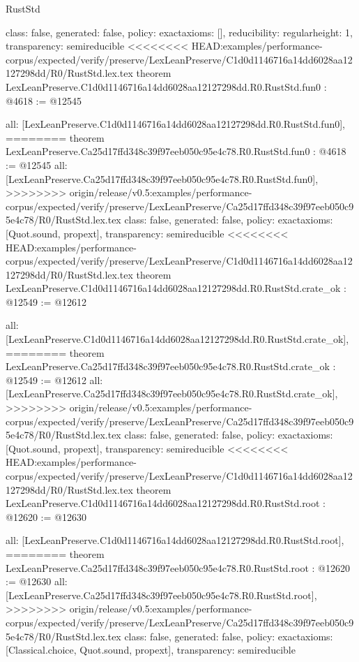 \begin{lexlean}{RustStd}
\begin{coremodule}
{\begin{coremodule}
{{{  class: false,
  generated: false,
  policy: exact{axioms: []},
  reducibility: regular{height: 1},
  transparency: semireducible
}
<<<<<<<< HEAD:examples/performance-corpus/expected/verify/preserve/LexLeanPreserve/C1d0d1146716a14dd6028aa12127298dd/R0/RustStd.lex.tex
theorem LexLeanPreserve.C1d0d1146716a14dd6028aa12127298dd.R0.RustStd.fun0 : @4618 := @12545 {
  all: [LexLeanPreserve.C1d0d1146716a14dd6028aa12127298dd.R0.RustStd.fun0],
========
theorem LexLeanPreserve.Ca25d17ffd348c39f97eeb050c95e4c78.R0.RustStd.fun0 : @4618 := @12545 {
  all: [LexLeanPreserve.Ca25d17ffd348c39f97eeb050c95e4c78.R0.RustStd.fun0],
>>>>>>>> origin/release/v0.5:examples/performance-corpus/expected/verify/preserve/LexLeanPreserve/Ca25d17ffd348c39f97eeb050c95e4c78/R0/RustStd.lex.tex
  class: false,
  generated: false,
  policy: exact{axioms: [Quot.sound, propext]},
  transparency: semireducible
}
<<<<<<<< HEAD:examples/performance-corpus/expected/verify/preserve/LexLeanPreserve/C1d0d1146716a14dd6028aa12127298dd/R0/RustStd.lex.tex
theorem LexLeanPreserve.C1d0d1146716a14dd6028aa12127298dd.R0.RustStd.crate_ok : @12549 := @12612 {
  all: [LexLeanPreserve.C1d0d1146716a14dd6028aa12127298dd.R0.RustStd.crate_ok],
========
theorem LexLeanPreserve.Ca25d17ffd348c39f97eeb050c95e4c78.R0.RustStd.crate_ok : @12549 := @12612 {
  all: [LexLeanPreserve.Ca25d17ffd348c39f97eeb050c95e4c78.R0.RustStd.crate_ok],
>>>>>>>> origin/release/v0.5:examples/performance-corpus/expected/verify/preserve/LexLeanPreserve/Ca25d17ffd348c39f97eeb050c95e4c78/R0/RustStd.lex.tex
  class: false,
  generated: false,
  policy: exact{axioms: [Quot.sound, propext]},
  transparency: semireducible
}
<<<<<<<< HEAD:examples/performance-corpus/expected/verify/preserve/LexLeanPreserve/C1d0d1146716a14dd6028aa12127298dd/R0/RustStd.lex.tex
theorem LexLeanPreserve.C1d0d1146716a14dd6028aa12127298dd.R0.RustStd.root : @12620 := @12630 {
  all: [LexLeanPreserve.C1d0d1146716a14dd6028aa12127298dd.R0.RustStd.root],
========
theorem LexLeanPreserve.Ca25d17ffd348c39f97eeb050c95e4c78.R0.RustStd.root : @12620 := @12630 {
  all: [LexLeanPreserve.Ca25d17ffd348c39f97eeb050c95e4c78.R0.RustStd.root],
>>>>>>>> origin/release/v0.5:examples/performance-corpus/expected/verify/preserve/LexLeanPreserve/Ca25d17ffd348c39f97eeb050c95e4c78/R0/RustStd.lex.tex
  class: false,
  generated: false,
  policy: exact{axioms: [Classical.choice, Quot.sound, propext]},
  transparency: semireducible
}

}}}}}
\end{coremodule}}
\end{coremodule}
\end{lexlean}
